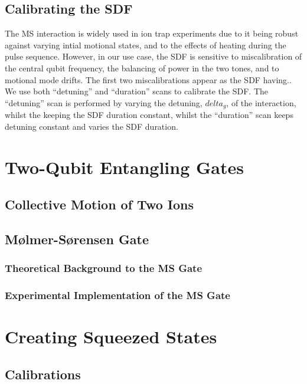 \documentclass[12pt]{report}
\begin{document}
\subsection{Calibrating the SDF}
    The MS interaction is widely used in ion trap experiments due to it being robust against varying intial motional states, and to the effects of heating during the pulse sequence. However, in our use case, the SDF is sensitive to miscalibration of the central qubit frequency, the balancing of power in the two tones, and to motional mode drifts. The first two miscalibrations appear as the SDF having..
    We use both ``detuning'' and ``duration'' scans to calibrate the SDF. The
    ``detuning'' scan is performed by varying the detuning, $delta_g$, of the interaction, whilst the keeping the SDF duration constant, whilst the ``duration'' scan keeps detuning constant and varies the SDF duration.

\section{Two-Qubit Entangling Gates}
\label{sec:Two-Qubit Entangling Gates}
\subsection{Collective Motion of Two Ions}
\subsection{Mølmer-Sørensen Gate}
\subsubsection{Theoretical Background to the MS Gate}
\subsubsection{Experimental Implementation of the MS Gate}

\section{Creating Squeezed States}
\label{sec:Squeezed States}
\subsection{Calibrations}
\end{document}
